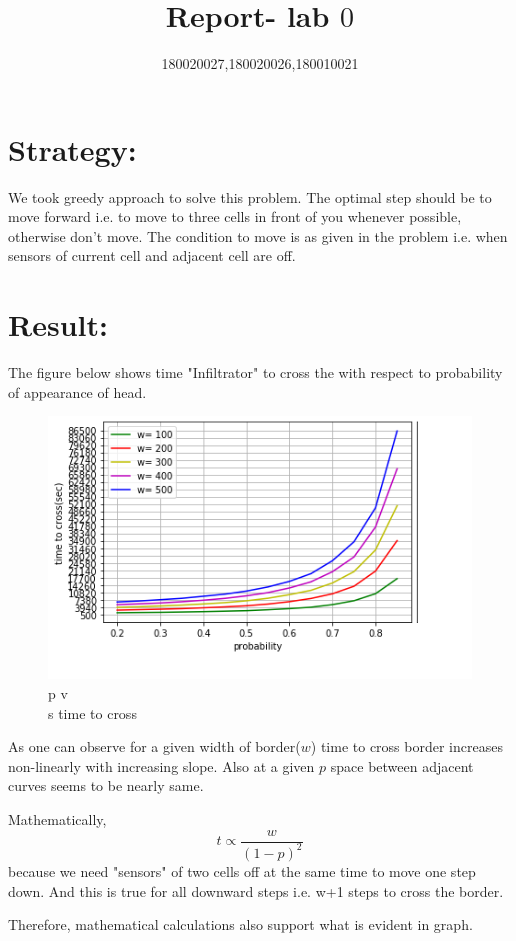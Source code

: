 \documentclass[11 pt]{article}
\begin{document}
\title{Report- lab $0$}
\author{180020027,180020026,180010021}
\maketitle
\section{Strategy:}
We took greedy approach to solve this problem. The optimal step should be to move forward i.e. to move to three cells in front of you whenever possible, otherwise don't move. The condition to move is as given in the problem i.e. when sensors of current cell and adjacent cell are off.
\section{Result:}
The figure below shows time "Infiltrator" to cross 
the with respect to probability of appearance of head.
\begin{figure}[ht]
\centering 
\includegraphics{finalimage.png}
\caption{{\large p v\\s time to cross}}
\label{fig1}
\end{figure}
As one can observe for a given width of border($w$) time to cross border increases non-linearly with increasing slope.
Also at a given $p$ space between adjacent curves seems to be nearly same.

Mathematically,$$ t \propto \frac{w}{(1-p)^2}$$
because we need "sensors" of two cells off at the same time to move one step down. And this is true for all downward steps i.e. w+1 steps to cross the border.

Therefore, mathematical calculations also support what is evident in graph.
\end{document}
